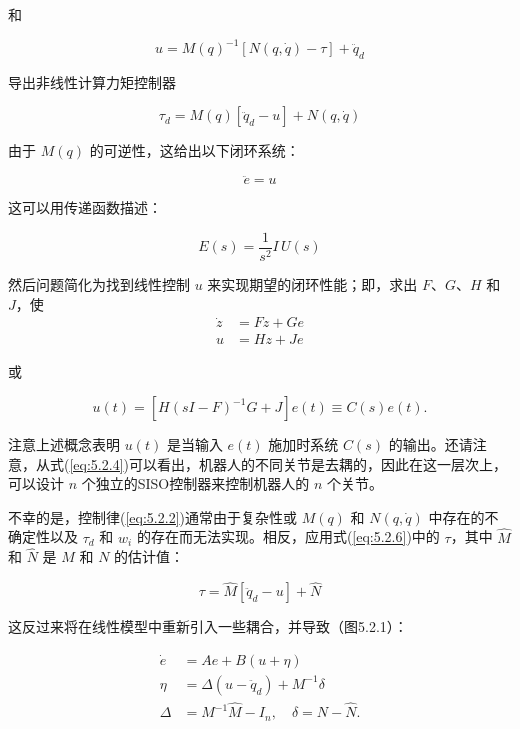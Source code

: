 \documentclass[UTF8,12pt,a4paper]{ctexart}
\begin{document}
和

\begin{equation}\label{eq:5.2.1}
u = M(q)^{-1}[N(q, \dot{q}) - \tau] + \ddot{q}_d
\end{equation}

导出非线性计算力矩控制器

\begin{equation}\label{eq:5.2.2}
\tau_d = M(q)[\ddot{q}_d - u] + N(q, \dot{q})
\end{equation}

由于 $M(q)$ 的可逆性，这给出以下闭环系统：

\begin{equation}\label{eq:5.2.3}
\ddot{e} = u
\end{equation}

这可以用传递函数描述：

\begin{equation}\label{eq:5.2.4}
E(s) = \frac{1}{s^2}I\,U(s)
\end{equation}

然后问题简化为找到线性控制 $u$ 来实现期望的闭环性能；即，求出 $F$、$G$、$H$ 和 $J$，使
\begin{align}
\dot{z} &= Fz + Ge \\
u &= Hz + Je
\end{align}

或

\begin{equation}\label{eq:5.2.5}
u(t) = [H(sI - F)^{-1}G + J]e(t) \equiv C(s)e(t).
\end{equation}

注意上述概念表明 $u(t)$ 是当输入 $e(t)$ 施加时系统 $C(s)$ 的输出。还请注意，从式(\ref{eq:5.2.4})可以看出，机器人的不同关节是去耦的，因此在这一层次上，可以设计 $n$ 个独立的SISO控制器来控制机器人的 $n$ 个关节。

不幸的是，控制律(\ref{eq:5.2.2})通常由于复杂性或 $M(q)$ 和 $N(q, \dot{q})$ 中存在的不确定性以及 $\tau_d$ 和 $w_i$ 的存在而无法实现。相反，应用式(\ref{eq:5.2.6})中的 $\tau$，其中 $\hat{M}$ 和 $\hat{N}$ 是 $M$ 和 $N$ 的估计值：

\begin{equation}\label{eq:5.2.6}
\tau = \hat{M}[\ddot{q}_d - u] + \hat{N}
\end{equation}

这反过来将在线性模型中重新引入一些耦合，并导致（图5.2.1）：

\begin{equation}\label{eq:5.2.7}
\begin{aligned}
\dot{e} &= Ae + B(u + \eta) \\
\eta &= \Delta(u - \ddot{q}_d) + M^{-1}\delta \\
\Delta &= M^{-1}\hat{M} - I_n, \quad \delta = N - \hat{N}.
\end{aligned}
\end{equation}
\end{document}
